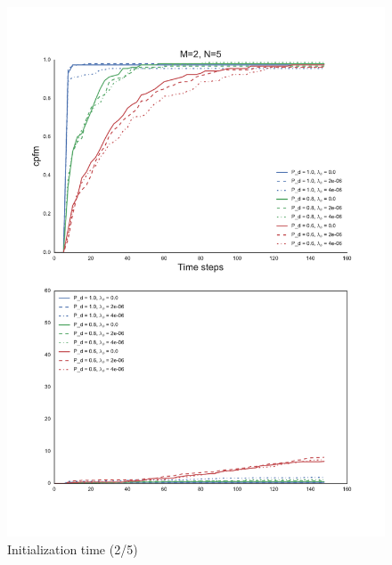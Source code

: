 \begin{figure}
\centering
\includegraphics[height = .9\textheight]{Figures/plots/Scenario1_Init-Time(2-5).pdf}
\caption{Initialization time (2/5)}\label{fig:init_time_2-5}
\end{figure}

